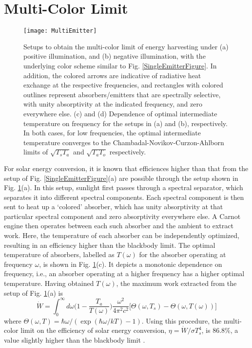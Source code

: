 \documentclass[notitlepage,onecolumn,aps,showpacs,preprintnumbers,amsmath,amssymb,superscriptaddress]{revtex4-1}
\begin{document}
\section{Multi-Color Limit}
\begin{figure}
\centering
\texttt{[image: MultiEmitter]}
\caption{Setups to obtain the multi-color limit of energy harvesting under (a) positive illumination, and (b) negative illumination, with the underlying color scheme similar to Fig. \ref{SingleEmitterFigure}. In addition, the colored arrows are indicative of radiative heat exchange at the respective frequencies, and rectangles with colored outlines represent absorbers/emitters that are spectrally selective, with unity absorptivity at the indicated frequency, and zero everywhere else. (c) and (d) Dependence of optimal intermediate temperature on frequency for the setups in (a) and (b), respectively. In both cases, for low frequencies, the optimal intermediate temperature converges to the Chambadal-Novikov-Curzon-Ahlborn limits of $\sqrt{T_sT_a}$ and $\sqrt{T_aT_o}$ respectively.}
\label{MultiEmitterFigure}
\end{figure}
For solar energy conversion, it is known that efficiences higher than that from the setup of Fig. \ref{SingleEmitterFigure}(a) are possible through the setup shown in Fig. \ref{MultiEmitterFigure}(a). In this setup, sunlight first passes through a spectral separator, which separates it into different spectral components. Each spectral component is then sent to heat up a `colored' absorber, which has unity absorptivity at that particular spectral component and zero absorptivity everywhere else. A Carnot engine then operates between each such absorber and the ambient to extract work. Here, the temperature of each absorber can be independently optimized, resulting in an efficiency higher than the blackbody limit. The optimal temperature of absorbers, labelled as $T(\omega)$ for the absorber operating at frequency $\omega$, is shown in Fig. \ref{MultiEmitterFigure}(c). It depicts a monotonic dependence on frequency, i.e., an absorber operating at a higher frequency has a higher optimal temperature. Having obtained $T(\omega)$, the maximum work extracted from the setup of Fig. \ref{MultiEmitterFigure}(a) is
\begin{equation}
\dot{W} = \int_0^\infty d\omega \Big(1-\frac{T_a}{T(\omega)}\Big)\frac{\omega^2}{4\pi^2c^2}\big[\Theta(\omega,T_s)-\Theta(\omega,T(\omega))\big]\label{multisolarstep1}
\end{equation}
where $\Theta(\omega,T) = \hbar\omega/(\exp(\hbar\omega/kT)-1)$. Using this procedure, the multi-color limit on the efficiency of solar energy conversion, $\eta = \dot{W}/\sigma T_s^4$, is 86.8\%, a value slightly higher than the blackbody limit \citep{greenbook}. \\
\end{document}
